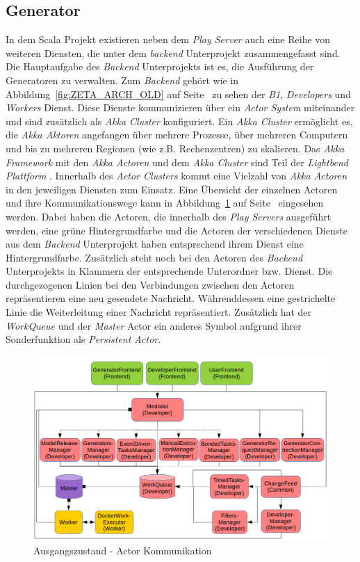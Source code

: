 \subsection{Generator}
\label{sec:INITIAL_GENERATOR}

In dem Scala Projekt existieren neben dem \textit{Play Server} auch eine Reihe von weiteren Diensten, die unter dem \textit{backend} Unterprojekt zusammengefasst sind. Die Hauptaufgabe des \textit{Backend} Unterprojekts ist es, die Ausführung der Generatoren zu verwalten. Zum \textit{Backend} gehört wie in Abbildung~\ref{fig:ZETA_ARCH_OLD} auf Seite~\pageref{fig:ZETA_ARCH_OLD} zu sehen der \textit{B1}, \textit{Developers} und \textit{Workers} Dienst. Diese Dienste kommunizieren über ein \textit{Actor System} miteinander und sind zusätzlich als \textit{Akka Cluster} konfiguriert. Ein \textit{Akka Cluster} ermöglicht es, die \textit{Akka Aktoren} angefangen über mehrere Prozesse, über mehreren Computern und bis zu mehreren Regionen (wie z.B. Rechenzentren) zu skalieren. Das \textit{Akka Framework} mit den \textit{Akka Actoren} und dem \textit{Akka Cluster} sind Teil der \textit{Lightbend Plattform} \cite{akka}. Innerhalb des \textit{Actor Clusters} kommt eine Vielzahl von \textit{Akka Actoren} in den jeweiligen Diensten zum Einsatz. Eine Übersicht der einzelnen Actoren und ihre Kommunikationswege kann in Abbildung~\ref{fig:ZETA_ACTOR_OLD} auf Seite~\pageref{fig:ZETA_ACTOR_OLD} eingesehen werden. Dabei haben die Actoren, die innerhalb des \textit{Play Servers} ausgeführt werden, eine grüne Hintergrundfarbe und die Actoren der verschiedenen Dienste aus dem \textit{Backend} Unterprojekt haben entsprechend ihrem Dienst eine Hintergrundfarbe. Zusätzlich steht noch bei den Actoren des \textit{Backend} Unterprojekts in Klammern der entsprechende Unterordner bzw. Dienst. Die durchgezogenen Linien bei den Verbindungen zwischen den Actoren repräsentieren eine neu gesendete Nachricht. Währenddessen eine gestrichelte Linie die Weiterleitung einer Nachricht repräsentiert. Zusätzlich hat der \textit{WorkQueue} und der \textit{Master} Actor ein anderes Symbol aufgrund ihrer Sonderfunktion als \textit{Persistent Actor}.

\begin{figure}
    \centering
    \includegraphics[width=5in]{figures/actor_backend_before.png}
    \caption{Ausgangszustand - Actor Kommunikation}
    \label{fig:ZETA_ACTOR_OLD}
\end{figure}

